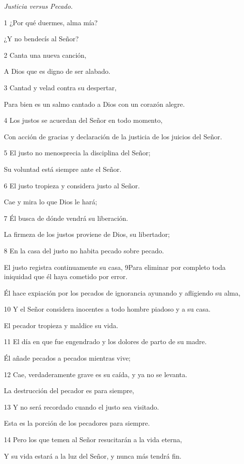 \par \textit{Justicia versus Pecado.}

\par 1 ¿Por qué duermes, alma mía?
\par     ¿Y no bendecís al Señor?
\par 2 Canta una nueva canción,
\par     A Dios que es digno de ser alabado.
\par 3 Cantad y velad contra su despertar,
\par     Para bien es un salmo cantado a Dios con un corazón alegre.
\par   
\par 4 Los justos se acuerdan del Señor en todo momento,
\par     Con acción de gracias y declaración de la justicia de los juicios del Señor.
\par 5 El justo no menosprecia la disciplina del Señor;
\par     Su voluntad está siempre ante el Señor.
\par 6 El justo tropieza y considera justo al Señor.
\par     Cae y mira lo que Dios le hará;
\par 7 Él busca de dónde vendrá su liberación.
\par     La firmeza de los justos proviene de Dios, su libertador;
\par 8 En la casa del justo no habita pecado sobre pecado.
\par     El justo registra continuamente su casa,
9Para eliminar por completo toda iniquidad que él haya cometido por error.
\par     Él hace expiación por los pecados de ignorancia ayunando y afligiendo su alma,
\par 10 Y el Señor considera inocentes a todo hombre piadoso y a su casa.
\par     El pecador tropieza y maldice su vida.
\par 11 El día en que fue engendrado y los dolores de parto de su madre.
\par     Él añade pecados a pecados mientras vive;
\par 12 Cae, verdaderamente grave es su caída, y ya no se levanta.
\par     La destrucción del pecador es para siempre,
\par 13 Y no será recordado cuando el justo sea visitado.
\par     Esta es la porción de los pecadores para siempre.
\par   
\par 14 Pero los que temen al Señor resucitarán a la vida eterna,
\par     Y su vida estará a la luz del Señor, y nunca más tendrá fin.

